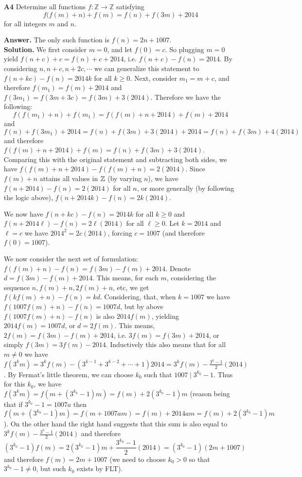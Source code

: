\documentclass[11pt,a4paper]{article}
\begin{document}
\begin{enumerate}
	\item[\textbf{A4}] Determine all functions $f: \mathbb{Z}\to\mathbb{Z}$ satisfying \[f\big(f(m)+n\big)+f(m)=f(n)+f(3m)+2014\] for all integers $m$ and $n$.
	
	\textbf{Answer.} The only such function is $f(n)=2n+1007$. \\
	\textbf{Solution.} We first consider $m=0$, and let $f(0)=c$. So plugging $m=0$ yield $f(n+c)+c=f(n)+c+2014$, i.e. $f(n+c)-f(n)=2014$. By considering $n, n+c, n+2c, \cdots$ we can generalize this statement to $f(n+kc)-f(n)=2014k$ for all $k\ge 0$. 
	Next, consider $m_1=m+c$, and therefore $f(m_1)=f(m)+2014$ and $f(3m_1)=f(3m+3c)=f(3m)+3(2014)$. 
	Therefore we have the following: 
	\[f(f(m_1)+n)+f(m_1)=f(f(m)+n+2014)+f(m)+2014\]
	and
	\[
	f(n)+f(3m_1)+2014=f(n)+f(3m)+3(2014)+2014=f(n)+f(3m)+4(2014)
	\]
	and therefore $f(f(m)+n+2014)+f(m)=f(n)+f(3m)+3(2014)$. Comparing this with the original statement and subtracting both sides, we have $f(f(m)+n+2014)-f(f(m)+n)=2(2014)$. Since $f(m)+n$ attains all values in $\mathbb{Z}$ (by varying $n$), we have $f(n+2014)-f(n)=2(2014)$ for all $n$, or more generally (by following the logic above), $f(n+2014k)-f(n)=2k(2014)$. 
	
	We now have $f(n+kc)-f(n)=2014k$ for all $k\ge 0$ and $f(n+2014\ell)-f(n)=2\ell(2014)$ for all $\ell\ge 0$. Let $k=2014$ and $\ell=c$ we have $2014^2=2c(2014)$, forcing $c=1007$ (and therefore $f(0)=1007$). 
	
	We now consider the next set of formulation: $f(f(m)+n)-f(n)=f(3m)-f(m)+2014$. Denote $d=f(3m)-f(m)+2014$. 
	This means, for each $m$, considering the sequence $n, f(m)+n, 2f(m)+n$, etc, we get $f(kf(m)+n)-f(n)=kd$. Considering, that, when $k=1007$ we have $f(1007f(m)+n)-f(n)=1007d$, but by above $f(1007f(m)+n)-f(n)$ is also $2014f(m)$, yielding $2014f(m)=1007d$, or $d=2f(m)$. This means, $2f(m)=f(3m)-f(m)+2014$, i.e. $3f(m)=f(3m)+2014$, or simply $f(3m)=3f(m)-2014$. Inductively this also means that for all $m\neq 0$ we have $f(3^km)=3^kf(m)-(3^{k-1}+3^{k-2}+\cdots + 1)2014=3^kf(m)-\frac{3^k-1}{2}(2014)$. By Fermat's little theorem, we can choose $k_0$ such that $1007\mid 3^{k_0}-1$. 
	Thus for this $k_0$, we have $f(3^km)=f(m+(3^{k_0}-1)m)=f(m)+2(3^{k_0}-1)m$ (reason being that if $3^{k_0}-1=1007a$ then $f(m+(3^{k_0}-1)m)=f(m+1007am)=f(m)+2014am=f(m)+2(3^{k_0}-1)m$). 
	On the other hand the right hand suggests that this sum is also equal to $3^kf(m)-\frac{3^k-1}{2}(2014)$ and therefore
	\[(3^{k_0}-1)f(m)=2(3^{k_0}-1)m + \frac{3^{k_0}-1}{2}(2014) = (3^{k_0}-1)(2m + 1007)
	\]
	and therefore $f(m)=2m+1007$ (we need to choose $k_0>0$ so that $3^{k_0}-1\neq 0$, but such $k_0$ exists by FLT). 
	

\end{enumerate}
\end{document}
